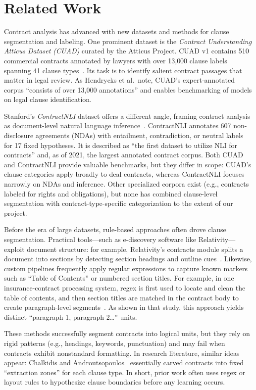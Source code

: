 \documentclass[11pt, oneside]{article}   	%
\begin{document}
\section*{Related Work}
Contract analysis has advanced with new datasets and methods for clause segmentation and labeling. One prominent dataset is the \textit{Contract Understanding Atticus Dataset (CUAD)} curated by the Atticus Project. CUAD v1 contains 510 commercial contracts annotated by lawyers with over 13{,}000 clause labels spanning 41 clause types~\cite{hendrycks2021cuad}. Its task is to identify salient contract passages that matter in legal review. As Hendrycks et al.\ note, CUAD’s expert-annotated corpus “consists of over 13,000 annotations” and enables benchmarking of models on legal clause identification.

Stanford’s \textit{ContractNLI} dataset offers a different angle, framing contract analysis as document-level natural language inference~\cite{koreeda2021contractnli}. ContractNLI annotates 607 non-disclosure agreements (NDAs) with entailment, contradiction, or neutral labels for 17 fixed hypotheses. It is described as “the first dataset to utilize NLI for contracts” and, as of 2021, the largest annotated contract corpus. Both CUAD and ContractNLI provide valuable benchmarks, but they differ in scope: CUAD’s clause categories apply broadly to deal contracts, whereas ContractNLI focuses narrowly on NDAs and inference. Other specialized corpora exist (e.g., contracts labeled for rights and obligations), but none has combined clause-level segmentation with contract-type-specific categorization to the extent of our project.

Before the era of large datasets, rule-based approaches often drove clause segmentation. Practical tools---such as e-discovery software like Relativity---exploit document structure: for example, Relativity’s contracts module splits a document into sections by detecting section headings and outline cues~\cite{relativitydocs}. Likewise, custom pipelines frequently apply regular expressions to capture known markers such as “Table of Contents” or numbered section titles. For example, in one insurance-contract processing system, regex is first used to locate and clean the table of contents, and then section titles are matched in the contract body to create paragraph-level segments~\cite{goossens2017processing}. As shown in that study, this approach yields distinct “paragraph 1, paragraph 2…” units.

These methods successfully segment contracts into logical units, but they rely on rigid patterns (e.g., headings, keywords, punctuation) and may fail when contracts exhibit nonstandard formatting. In research literature, similar ideas appear: Chalkidis and Androutsopoulos~\cite{chalkidis2017extraction} essentially carved contracts into fixed “extraction zones” for each clause type. In short, prior work often uses regex or layout rules to hypothesize clause boundaries before any learning occurs.
\end{document}
